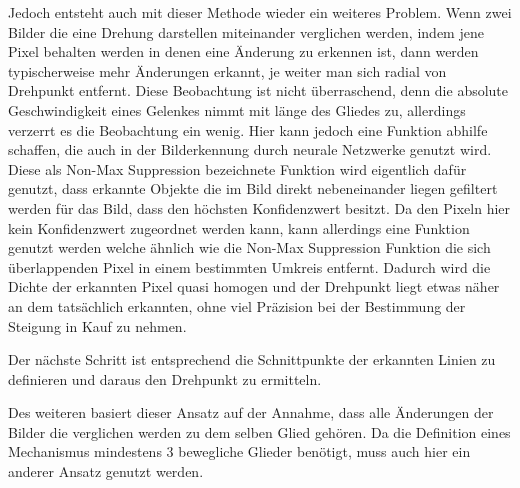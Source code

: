 Jedoch entsteht auch mit dieser Methode wieder ein weiteres Problem.
Wenn zwei Bilder die eine Drehung darstellen miteinander verglichen werden, indem jene Pixel behalten werden in denen eine Änderung zu erkennen ist, dann werden typischerweise mehr Änderungen erkannt, je weiter man sich radial von Drehpunkt entfernt.
Diese Beobachtung ist nicht überraschend, denn die absolute Geschwindigkeit eines Gelenkes nimmt mit länge des Gliedes zu, allerdings verzerrt es die Beobachtung ein wenig.
Hier kann jedoch eine Funktion abhilfe schaffen, die auch in der Bilderkennung durch neurale Netzwerke genutzt wird.
Diese als Non-Max Suppression %
bezeichnete Funktion wird eigentlich dafür genutzt, dass erkannte Objekte die im Bild direkt nebeneinander liegen gefiltert werden für das Bild, dass den höchsten Konfidenzwert besitzt.
Da den Pixeln hier kein Konfidenzwert zugeordnet werden kann, kann allerdings eine Funktion genutzt werden welche ähnlich wie die Non-Max Suppression Funktion %
die sich überlappenden Pixel in einem bestimmten Umkreis entfernt.
Dadurch wird die Dichte der erkannten Pixel quasi homogen und der Drehpunkt liegt etwas näher an dem tatsächlich erkannten, ohne viel Präzision bei der Bestimmung der Steigung in Kauf zu nehmen.

Der nächste Schritt ist entsprechend die Schnittpunkte der erkannten Linien zu definieren und daraus den Drehpunkt zu ermitteln.



Des weiteren basiert dieser Ansatz auf der Annahme, dass alle Änderungen der Bilder die verglichen werden zu dem selben Glied gehören.
Da die Definition eines Mechanismus mindestens 3 bewegliche Glieder benötigt, muss auch hier ein anderer Ansatz genutzt werden. %



